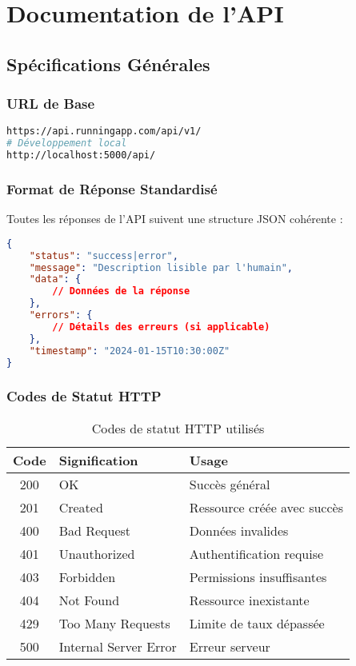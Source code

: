 \section{Documentation de l'API}

\subsection{Spécifications Générales}

\subsubsection{URL de Base}
\begin{lstlisting}[language=bash]
https://api.runningapp.com/api/v1/
# Développement local
http://localhost:5000/api/
\end{lstlisting}

\subsubsection{Format de Réponse Standardisé}

Toutes les réponses de l'API suivent une structure JSON cohérente :

\begin{lstlisting}[language=json]
{
    "status": "success|error",
    "message": "Description lisible par l'humain",
    "data": {
        // Données de la réponse
    },
    "errors": {
        // Détails des erreurs (si applicable)
    },
    "timestamp": "2024-01-15T10:30:00Z"
}
\end{lstlisting}

\subsubsection{Codes de Statut HTTP}

\begin{table}[H]
\centering
\begin{tabular}{|c|l|l|}
\hline
\textbf{Code} & \textbf{Signification} & \textbf{Usage} \\
\hline
200 & OK & Succès général \\
201 & Created & Ressource créée avec succès \\
400 & Bad Request & Données invalides \\
401 & Unauthorized & Authentification requise \\
403 & Forbidden & Permissions insuffisantes \\
404 & Not Found & Ressource inexistante \\
429 & Too Many Requests & Limite de taux dépassée \\
500 & Internal Server Error & Erreur serveur \\
\hline
\end{tabular}
\caption{Codes de statut HTTP utilisés}
\end{table}

